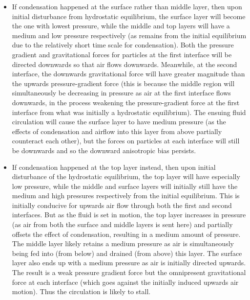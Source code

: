 \begin{itemize}
	\item If condensation happened at the surface rather than middle layer, then upon initial disturbance from hydrostatic equilibrium, the surface layer will become the one with lowest pressure, while the middle and top layers will have a medium and low pressure respectively (as remains from the initial equilibrium due to the relatively short time scale for condensation). Both the pressure gradient and gravitational forces for particles at the first interface will be directed downwards so that air flows downwards. Meanwhile, at the second interface, the downwards gravitational force will have greater magnitude than the upwards pressure-gradient force (this is because the middle region will simultaneously be decreasing in pressure as air at the first interface flows downwards, in the process weakening the pressure-gradient force at the first interface from what was initially a hydrostatic equilibrium). The ensuing fluid circulation will cause the surface layer to have medium pressure (as the effects of condensation and airflow into this layer from above partially counteract each other), but the forces on particles at each interface will still be downwards and so the downward anisotropic bias persists.
	\item If condensation happened at the top layer instead, then upon initial disturbance of the hydrostatic equilibrium, the top layer will have especially low pressure, while the middle and surface layers will initially still have the medium and high pressures respectively from the initial equilibrium. This is initially conducive for upwards air flow through both the first and second interfaces. But as the fluid is set in motion, the top layer increases in pressure (as air from both the surface and middle layers is sent here) and partially offsets the effect of condensation, resulting in a medium amount of pressure. The middle layer likely retains a medium pressure as air is simultaneously being fed into (from below) and drained (from above) this layer. The surface layer also ends up with a medium pressure as air is initially directed upwards. The result is a weak pressure gradient force but the omnipresent gravitational force at each interface (which goes against the initially induced upwards air motion). Thus the circulation is likely to stall.
\end{itemize}
